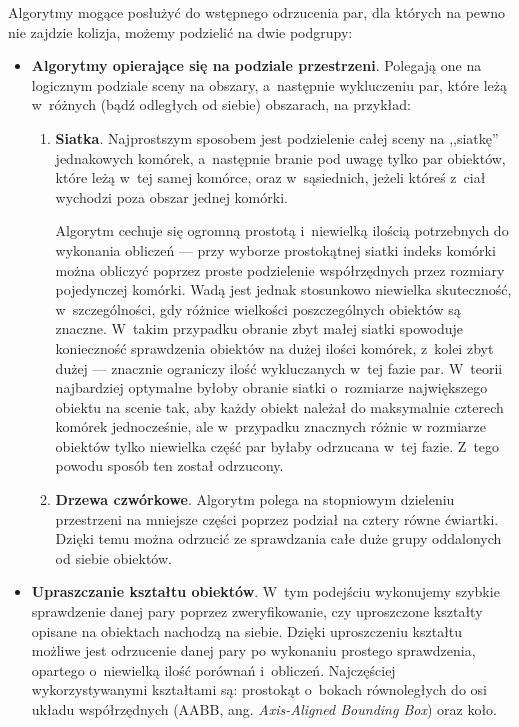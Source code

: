 Algorytmy mogące posłużyć do wstępnego odrzucenia par, dla których na pewno nie zajdzie kolizja, możemy podzielić na dwie podgrupy:
\begin{itemize}
	\item \textbf{Algorytmy opierające się na podziale przestrzeni}. Polegają one na logicznym podziale sceny na obszary, a~następnie wykluczeniu par, które leżą w~różnych (bądź odległych od siebie) obszarach, na przykład:
	\begin{enumerate}
		\item \textbf{Siatka}. Najprostszym sposobem jest podzielenie całej sceny na ,,siatkę'' jednakowych komórek, a~następnie branie pod uwagę tylko par obiektów, które leżą w~tej samej komórce, oraz w~sąsiednich, jeżeli któreś z~ciał wychodzi poza obszar jednej komórki. 
		
		Algorytm cechuje się ogromną prostotą i~niewielką ilością potrzebnych do wykonania obliczeń --- przy wyborze prostokątnej siatki indeks komórki można obliczyć poprzez proste podzielenie współrzędnych przez rozmiary pojedynczej komórki. Wadą jest jednak stosunkowo niewielka skuteczność, w~szczególności, gdy różnice wielkości poszczególnych obiektów są znaczne. W~takim przypadku obranie zbyt małej siatki spowoduje konieczność sprawdzenia obiektów na dużej ilości komórek, z~kolei  zbyt dużej --- znacznie ograniczy ilość wykluczanych w~tej fazie par. W~teorii najbardziej optymalne byłoby obranie siatki o~rozmiarze największego obiektu na scenie tak, aby każdy obiekt należał do maksymalnie czterech komórek jednocześnie, ale w~przypadku znacznych różnic w rozmiarze obiektów tylko niewielka część par byłaby odrzucana w~tej fazie. Z~tego powodu sposób ten został odrzucony.
		
		\item \textbf{Drzewa czwórkowe}. Algorytm polega na stopniowym dzieleniu przestrzeni na mniejsze części poprzez podział na cztery równe ćwiartki. Dzięki temu można odrzucić ze sprawdzania całe duże grupy oddalonych od siebie obiektów.
	\end{enumerate}

		\item \textbf{Upraszczanie kształtu obiektów}. W~tym podejściu wykonujemy szybkie sprawdzenie danej pary poprzez zweryfikowanie, czy uproszczone kształty opisane na obiektach nachodzą na siebie. Dzięki uproszczeniu kształtu możliwe jest odrzucenie danej pary po wykonaniu prostego sprawdzenia, opartego o~niewielką ilość porównań i~obliczeń. Najczęściej wykorzystywanymi kształtami są: prostokąt o~bokach równoległych do osi układu współrzędnych (AABB, ang. \textit{Axis-Aligned Bounding Box}) oraz koło.
\end{itemize}

